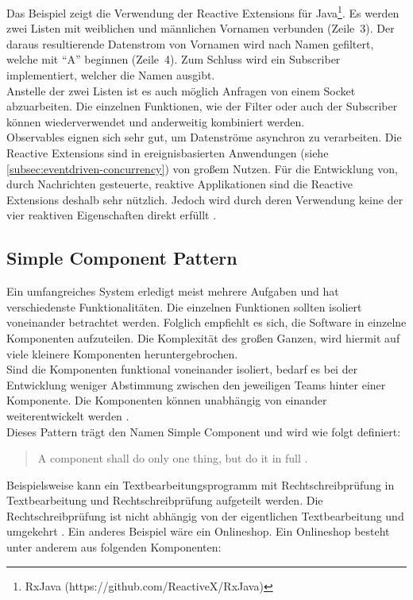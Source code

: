 Das Beispiel zeigt die Verwendung der Reactive Extensions für Java\footnote{RxJava (https://github.com/ReactiveX/RxJava)}. Es werden zwei Listen mit weiblichen und männlichen Vornamen verbunden (Zeile~3). Der daraus resultierende Datenstrom von Vornamen wird nach Namen gefiltert, welche mit \enquote{A} beginnen (Zeile~4). Zum Schluss wird ein Subscriber implementiert, welcher die Namen ausgibt.\\
Anstelle der zwei Listen ist es auch möglich Anfragen von einem Socket abzuarbeiten. Die einzelnen Funktionen, wie der Filter oder auch der Subscriber können wiederverwendet und anderweitig kombiniert werden.\\

Observables eignen sich sehr gut, um Datenströme asynchron zu verarbeiten. Die Reactive Extensions sind in ereignisbasierten Anwendungen (siehe \ref{subsec:eventdriven-concurrency}) von großem Nutzen. Für die Entwicklung von, durch Nachrichten gesteuerte, reaktive Applikationen sind die Reactive Extensions deshalb sehr nützlich. Jedoch wird durch deren Verwendung keine der vier reaktiven Eigenschaften direkt erfüllt \cite[S.~82]{kuhn_reactive_2015}.

\pagebreak

\subsection{Simple Component Pattern}\label{subsec:simple-component-pattern}
Ein umfangreiches System erledigt meist mehrere Aufgaben und hat verschiedenste Funktionalitäten. Die einzelnen Funktionen sollten isoliert voneinander betrachtet werden. Folglich empfiehlt es sich, die Software in einzelne Komponenten aufzuteilen. Die Komplexität des großen Ganzen, wird hiermit auf viele kleinere Komponenten heruntergebrochen.\\
Sind die Komponenten funktional voneinander isoliert, bedarf es bei der Entwicklung weniger Abstimmung zwischen den jeweiligen Teams hinter einer Komponente. Die Komponenten können unabhängig von einander weiterentwickelt werden \cite[S.~215]{newman_building_2015}.\\
Dieses Pattern trägt den Namen Simple Component und wird wie folgt definiert:

\begin{quotation}
A component shall do only one thing, but do it in full \cite[S.~185]{kuhn_reactive_2015}.
\end{quotation}

Beispielsweise kann ein Textbearbeitungsprogramm mit Rechtschreibprüfung in Textbearbeitung und Rechtschreibprüfung aufgeteilt werden. Die Rechtschreibprüfung ist nicht abhängig von der eigentlichen Textbearbeitung und umgekehrt \cite[S.~185]{kuhn_reactive_2015}. Ein anderes Beispiel wäre ein Onlineshop. Ein Onlineshop besteht unter anderem aus folgenden Komponenten:

